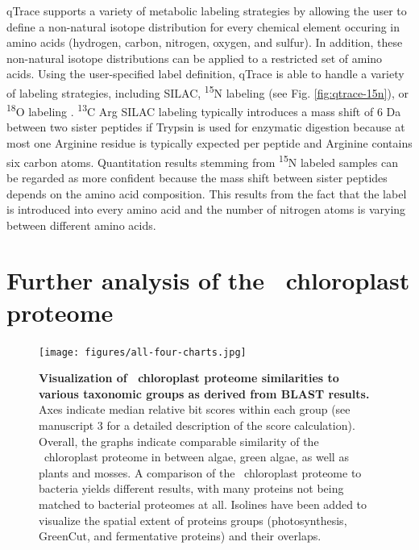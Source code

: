 qTrace supports a variety of metabolic labeling strategies by allowing the 
user to define a non-natural isotope distribution for every chemical element 
occuring in amino acids (hydrogen, carbon, nitrogen, oxygen, and sulfur).
In addition, these non-natural isotope distributions can be applied 
to a restricted set of amino acids.
Using the user-specified label definition, qTrace is able to handle a variety
of labeling strategies, including SILAC, \textsuperscript{15}N labeling (see 
Fig. \ref{fig:qtrace-15n}), or \textsuperscript{18}O labeling 
\citep{Miyagi2007}.
\textsuperscript{13}C Arg SILAC labeling typically introduces a mass shift
of 6 Da between two sister peptides if Trypsin is used for enzymatic digestion
because at most one Arginine residue is typically expected per peptide and
Arginine contains six carbon atoms.
Quantitation results stemming from \textsuperscript{15}N labeled samples
can be regarded as more confident because the mass shift between sister peptides
depends on the amino acid composition.
This results from the fact that the label is introduced into every amino acid
and the number of nitrogen atoms is varying between different amino acids.

% 

\section{Further analysis of the \cre~chloroplast proteome}

\begin{figure}
\texttt{[image: figures/all-four-charts.jpg]}
\caption{
    {\bf Visualization of \cre~chloroplast proteome similarities to
    various taxonomic groups as derived from BLAST results.}
    Axes indicate median relative bit scores within each group (see
    manuscript 3 for a detailed description of the score calculation).
    Overall, the graphs indicate comparable similarity of the \cre~chloroplast
    proteome in between algae, green algae, as well as plants and mosses.
    A comparison of the \cre~chloroplast proteome to bacteria yields
    different results, with many proteins not being matched to bacterial
    proteomes at all.
    Isolines have been added to visualize the spatial extent of proteins groups 
    (photosynthesis, GreenCut, and fermentative proteins) and their overlaps.
}
\label{fig:mia-review-isolines}
\end{figure}

